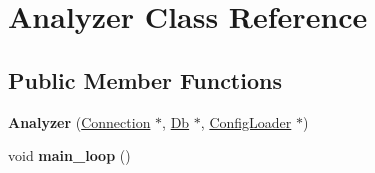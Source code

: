 \hypertarget{class_analyzer}{
\section{Analyzer Class Reference}
\label{class_analyzer}
}
\subsection*{Public Member Functions}
\begin{DoxyCompactItemize}
\item 
\hypertarget{class_analyzer_a7fa6d8506ba0d9c3a848492c0c6cbebc}{
{\bfseries Analyzer} (\hyperlink{class_connection}{Connection} $\ast$, \hyperlink{class_db}{Db} $\ast$, \hyperlink{class_config_loader}{ConfigLoader} $\ast$)}
\label{class_analyzer_a7fa6d8506ba0d9c3a848492c0c6cbebc}

\item 
\hypertarget{class_analyzer_acbb4f7dff3771e5cc7ca87b0d6c49278}{
void {\bfseries main\_\-loop} ()}
\label{class_analyzer_acbb4f7dff3771e5cc7ca87b0d6c49278}

\end{DoxyCompactItemize}

